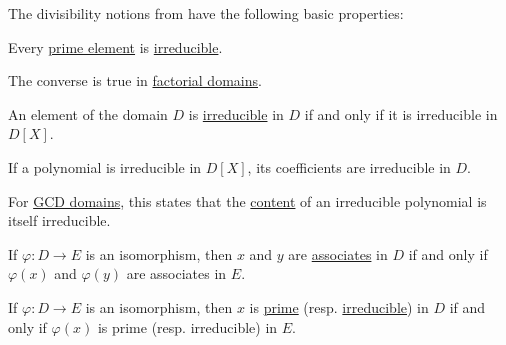 \begin{proposition}\label{thm:def:domain_divisibility}
  The divisibility notions from  have the following basic properties:
  \begin{thmenum}
     Every \hyperref[def:domain_divisibility/prime]{prime element} is \hyperref[def:domain_divisibility/irreducible]{irreducible}.

    The converse is true in \hyperref[def:factorial_domain]{factorial domains}.

     An element of the domain \( D \) is \hyperref[def:domain_divisibility/irreducible]{irreducible} in \( D \) if and only if it is irreducible in \( D[X] \).

     If a polynomial is irreducible in \( D[X] \), its coefficients are irreducible in \( D \).

    For \hyperref[def:gcd_domain]{GCD domains}, this states that the \hyperref[def:polynomial_content]{content} of an irreducible polynomial is itself irreducible.

     If \( \varphi: D \to E \) is an isomorphism, then \( x \) and \( y \) are \hyperref[def:domain_divisibility/associates]{associates} in \( D \) if and only if \( \varphi(x) \) and \( \varphi(y) \) are associates in \( E \).

     If \( \varphi: D \to E \) is an isomorphism, then \( x \) is \hyperref[def:domain_divisibility/prime]{prime} (resp. \hyperref[def:domain_divisibility/irreducible]{irreducible}) in \( D \) if and only if \( \varphi(x) \) is prime (resp. irreducible) in \( E \).
  \end{thmenum}
\end{proposition}
